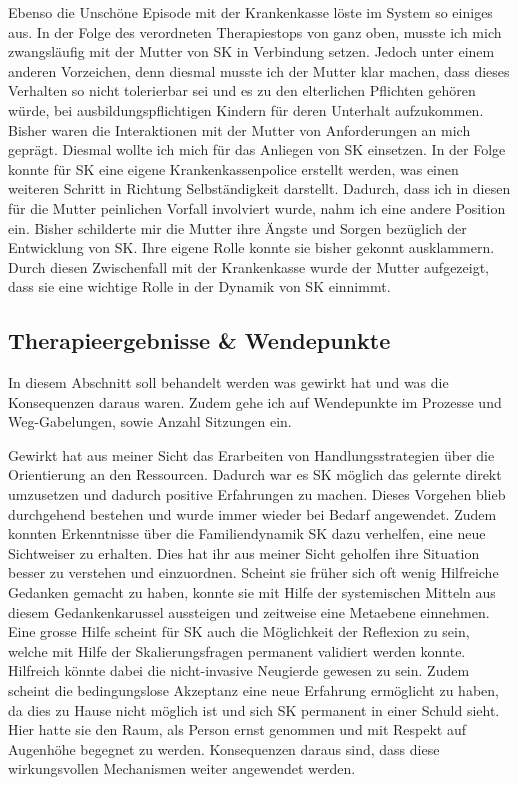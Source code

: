 Ebenso die Unschöne Episode mit der Krankenkasse löste im System so einiges aus. In der Folge des verordneten Therapiestops von ganz oben, musste ich mich zwangsläufig mit der Mutter von SK in Verbindung setzen. Jedoch unter einem anderen Vorzeichen, denn diesmal musste ich der Mutter klar machen, dass dieses Verhalten so nicht tolerierbar sei und es zu den elterlichen Pflichten gehören würde, bei ausbildungspflichtigen Kindern für deren Unterhalt aufzukommen. Bisher waren die Interaktionen mit der Mutter von Anforderungen an mich geprägt. Diesmal wollte ich mich für das Anliegen von SK einsetzen. In der Folge konnte für SK eine eigene Krankenkassenpolice erstellt werden, was einen weiteren Schritt in Richtung Selbständigkeit darstellt. Dadurch, dass ich in diesen für die Mutter peinlichen Vorfall involviert wurde, nahm ich eine andere Position ein. Bisher schilderte mir die Mutter ihre Ängste und Sorgen bezüglich der Entwicklung von SK. Ihre eigene Rolle konnte sie bisher gekonnt ausklammern. Durch diesen Zwischenfall mit der Krankenkasse wurde der Mutter aufgezeigt, dass sie eine wichtige Rolle in der Dynamik von SK einnimmt. 
 

\subsection{Therapieergebnisse \& Wendepunkte} \label{sc:therapieergebnisse}
In diesem Abschnitt soll behandelt werden was gewirkt hat und was die Konsequenzen daraus waren. Zudem gehe ich auf Wendepunkte im Prozesse und Weg-Gabelungen, sowie Anzahl Sitzungen ein. 

Gewirkt hat aus meiner Sicht das Erarbeiten von Handlungsstrategien über die Orientierung an den Ressourcen. Dadurch war es SK möglich das gelernte direkt umzusetzen und dadurch positive Erfahrungen zu machen. Dieses Vorgehen blieb durchgehend bestehen und wurde immer wieder bei Bedarf angewendet. Zudem konnten Erkenntnisse über die Familiendynamik SK dazu verhelfen, eine neue Sichtweiser zu erhalten. Dies hat ihr aus meiner Sicht geholfen ihre Situation besser zu verstehen und einzuordnen. Scheint sie früher sich oft wenig Hilfreiche Gedanken gemacht zu haben, konnte sie mit Hilfe der systemischen Mitteln aus diesem Gedankenkarussel aussteigen und zeitweise eine Metaebene einnehmen. Eine grosse Hilfe scheint für SK auch die Möglichkeit der Reflexion zu sein, welche mit Hilfe der Skalierungsfragen permanent validiert werden konnte. Hilfreich könnte dabei die nicht-invasive Neugierde gewesen zu sein. Zudem scheint die bedingungslose Akzeptanz eine neue Erfahrung ermöglicht zu haben, da dies zu Hause nicht möglich ist und sich SK permanent in einer Schuld sieht. Hier hatte sie den Raum, als Person ernst genommen und mit Respekt auf Augenhöhe begegnet zu werden. Konsequenzen daraus sind, dass diese wirkungsvollen Mechanismen weiter angewendet werden.  

